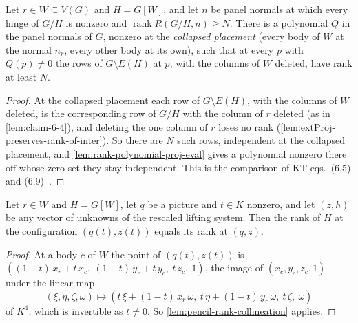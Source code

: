 \begin{lemma}
  \label{lem:pencil-contract-degenerate-rank}
  \leanok
  Let $r \in W \subseteq V(G)$ and $H = G[W]$, and let $n$ be panel
  normals at which every hinge of $G/H$ is nonzero and
  $\operatorname{rank} R(G/H, n) \ge N$. There is a polynomial $Q$ in the
  panel normals of $G$, nonzero at the \emph{collapsed placement} (every
  body of $W$ at the normal $n_r$, every other body at its own), such
  that at every $p$ with $Q(p) \neq 0$ the rows of $G \setminus E(H)$ at
  $p$, with the columns of $W$ deleted, have rank at least $N$.
\end{lemma}
\begin{proof}
  \leanok
  At the collapsed placement each row of $G \setminus E(H)$, with the
  columns of $W$ deleted, is the corresponding row of $G/H$ with the
  column of $r$ deleted (as in \cref{lem:claim-6-4}), and deleting the
  one column of $r$ loses no rank
  (\cref{lem:extProj-preserves-rank-of-inter}). So there are $N$ such
  rows, independent at the collapsed placement, and
  \cref{lem:rank-polynomial-proj-eval} gives a polynomial nonzero there
  off whose zero set they stay independent. This is the comparison of
  KT eqs.~(6.5) and (6.9)~\cite[pp.~674--675]{katohTanigawa2011}.
\end{proof}

\begin{lemma}
  \label{lem:pencil-contract-magnified-rank}
  \leanok
  Let $r \in W$ and $H = G[W]$, let $q$ be a picture and $t \in K$
  nonzero, and let $(z, h)$ be any vector of unknowns of the rescaled
  lifting system. Then the rank of $H$ at the configuration
  $(q(t), z(t))$ equals its rank at $(q, z)$.
\end{lemma}
\begin{proof}
  \leanok
  At a body $c$ of $W$ the point of $(q(t), z(t))$ is
  $((1 - t)\,x_r + t\,x_c,\ (1 - t)\,y_r + t\,y_c,\ t\,z_c,\ 1)$, the
  image of $(x_c, y_c, z_c, 1)$ under the linear map
  \[
    (\xi, \eta, \zeta, \omega) \mapsto
    (t\,\xi + (1 - t)\,x_r\,\omega,\ t\,\eta + (1 - t)\,y_r\,\omega,\
     t\,\zeta,\ \omega)
  \]
  of $K^4$, which is invertible as $t \neq 0$. So
  \cref{lem:pencil-rank-collineation} applies.
\end{proof}

